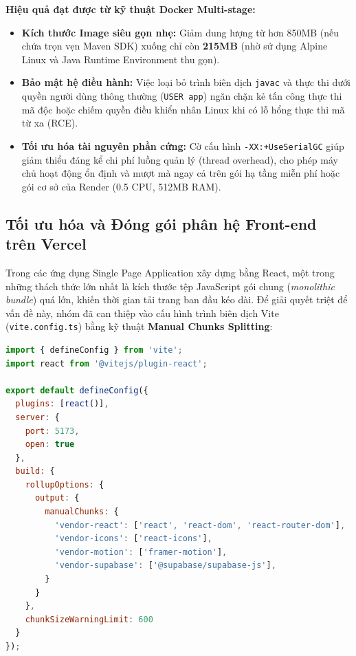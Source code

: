 \noindent\textbf{Hiệu quả đạt được từ kỹ thuật Docker Multi-stage:}
\begin{itemize}
    \item \textbf{Kích thước Image siêu gọn nhẹ:} Giảm dung lượng từ hơn 850MB (nếu chứa trọn vẹn Maven SDK) xuống chỉ còn \textbf{215MB} (nhờ sử dụng Alpine Linux và Java Runtime Environment thu gọn).
    \item \textbf{Bảo mật hệ điều hành:} Việc loại bỏ trình biên dịch \texttt{javac} và thực thi dưới quyền người dùng thông thường (\texttt{USER app}) ngăn chặn kẻ tấn công thực thi mã độc hoặc chiếm quyền điều khiển nhân Linux khi có lỗ hổng thực thi mã từ xa (RCE).
    \item \textbf{Tối ưu hóa tài nguyên phần cứng:} Cờ cấu hình \texttt{-XX:+UseSerialGC} giúp giảm thiểu đáng kể chi phí luồng quản lý (thread overhead), cho phép máy chủ hoạt động ổn định và mượt mà ngay cả trên gói hạ tầng miễn phí hoặc gói cơ sở của Render (0.5 CPU, 512MB RAM).
\end{itemize}

\subsection{Tối ưu hóa và Đóng gói phân hệ Front-end trên Vercel}

Trong các ứng dụng Single Page Application xây dựng bằng React, một trong những thách thức lớn nhất là kích thước tệp JavaScript gói chung (\textit{monolithic bundle}) quá lớn, khiến thời gian tải trang ban đầu kéo dài. Để giải quyết triệt để vấn đề này, nhóm đã can thiệp vào cấu hình trình biên dịch Vite (\texttt{vite.config.ts}) bằng kỹ thuật \textbf{Manual Chunks Splitting}:

\begin{lstlisting}[language=JavaScript, caption={Cấu hình chia nhỏ gói tải trong vite.config.ts}]
import { defineConfig } from 'vite';
import react from '@vitejs/plugin-react';

export default defineConfig({
  plugins: [react()],
  server: {
    port: 5173,
    open: true
  },
  build: {
    rollupOptions: {
      output: {
        manualChunks: {
          'vendor-react': ['react', 'react-dom', 'react-router-dom'],
          'vendor-icons': ['react-icons'],
          'vendor-motion': ['framer-motion'],
          'vendor-supabase': ['@supabase/supabase-js'],
        }
      }
    },
    chunkSizeWarningLimit: 600
  }
});
\end{lstlisting}

